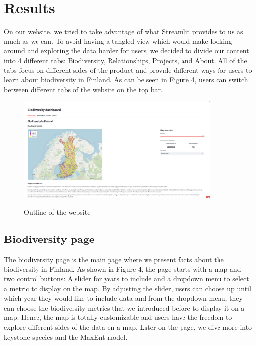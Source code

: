 \documentclass{article}
\begin{document}
\section{Results}
On our website, we tried to take advantage of what Streamlit provides to us as much as we can. To avoid having a tangled view which would make looking around and exploring the data harder for users, we decided to divide our content into 4 different tabs: Biodiversity, Relationships, Projects, and About. All of the tabs focus on different sides of the product and provide different ways for users to learn about biodiversity in Finland. As can be seen in Figure 4, users can switch between different tabs of the website on the top bar.
\begin{figure}[h]
	\vspace*{-2mm}
	\centering
	{\includegraphics[width=10cm]{landing_page}\label{landing_page}}
	\vspace*{-2mm}
	\caption{Outline of the website}
	\vspace*{-5mm}
\end{figure}
\subsection{Biodiversity page}
The biodiversity page is the main page where we present facts about the biodiversity in Finland. As shown in Figure 4, the page starts with a map and two control buttons: A slider for years to include and a dropdown menu to select a metric to display on the map. By adjusting the slider, users can choose up until which year they would like to include data and from the dropdown menu, they can choose the biodiversity metrics that we introduced before to display it on a map. Hence, the map is totally customizable and users have the freedom to explore different sides of the data on a map. Later on the page, we dive more into keystone species and the MaxEnt model.
\end{document}
